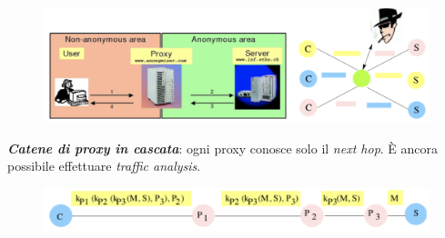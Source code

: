 \documentclass[11pt, a4paper, twoside, italian]{report}
\theoremstyle{plain}
\begin{document}
\begin{figure}[H]
	\centering
	\includegraphics[scale=0.63]{proxy}
\end{figure}
\begin{multicols}{2}
	\noindent
	\textit{\textbf{Catene di proxy in cascata}}: ogni proxy conosce solo il \textit{next hop}. È ancora possibile effettuare \textit{traffic analysis}.
\columnbreak
	\begin{figure}[H]
		\centering
		\includegraphics[scale=0.55]{proxycasc}
	\end{figure}
\end{multicols}
\end{document}

